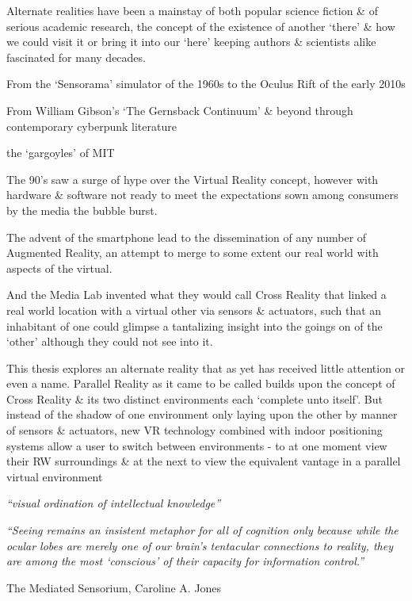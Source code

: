 Alternate realities have been a mainstay of both popular science fiction \& of serious academic research, the concept of the existence of another `there' \& how we could visit it or bring it into our `here'
keeping authors \& scientists alike fascinated for many decades.

From the `Sensorama' simulator of the 1960s to the Oculus Rift of the early 2010s

From William Gibson's `The Gernsback Continuum' \& beyond through contemporary cyberpunk literature

the `gargoyles' of MIT


The 90's saw a surge of hype over the Virtual Reality concept, however with hardware \& software not ready to meet the expectations sown among consumers by the media the bubble burst.

The advent of the smartphone lead to the dissemination of any number of Augmented Reality, an attempt to merge to some extent our real world with aspects of the virtual.


And the Media Lab invented what they would call Cross Reality that linked a real world location with a virtual other via sensors \& actuators, such that an inhabitant of one could glimpse a tantalizing insight into the goings on of the `other' although they could not see into it.

This thesis explores an alternate reality that as yet has received little attention or even a name. Parallel Reality as it came to be called builds upon the concept of Cross Reality \& its two distinct environments each `complete unto itself'. But instead of the shadow of one environment only laying upon the other by manner of sensors \& actuators, new VR technology combined with indoor positioning systems allow a user to switch between environments - to at one moment view their RW surroundings \& at the next to view the equivalent vantage in a parallel virtual environment


\textit{``visual ordination of intellectual knowledge''}

\textit{``Seeing remains an insistent metaphor for all of cognition only because while the ocular lobes are merely one of our brain's tentacular connections to reality, they are among the most `conscious' of their capacity for information control.''}

The Mediated Sensorium, Caroline A. Jones




